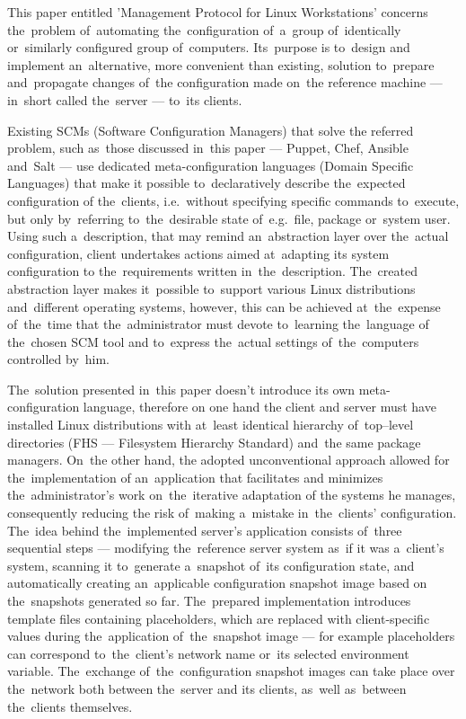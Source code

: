 \documentclass[11pt,a4paper]{article}
\begin{document}
This paper entitled 'Management Protocol for Linux Workstations' concerns the~problem of~automating the~configuration of~a~group of~identically or~similarly configured group of~computers. Its~purpose is to~design and implement an~alternative, more convenient than existing, solution to~prepare and~propagate changes of~the configuration made on~the reference machine --- in~short called the~server --- to~its clients.

Existing SCMs (Software Configuration Managers) that solve the referred problem, such as~those discussed in~this paper --- Puppet, Chef, Ansible and~Salt --- use dedicated meta-configuration languages (Domain Specific Languages) that make it possible to~declaratively describe the~expected configuration of the~clients, i.e.~without specifying specific commands to~execute, but only by~referring to~the~desirable state of~e.g.~file, package or~system user. Using such a~description, that may remind an~abstraction layer over the~actual configuration, client undertakes actions aimed at~adapting its system configuration to the~requirements written in~the~description. The~created abstraction layer makes it~possible to~support various Linux distributions and~different operating systems, however, this can be achieved at~the~expense of~the~time that the~administrator must devote to~learning the~language of the~chosen SCM tool and to~express the~actual settings of~the~computers controlled by~him.

The~solution presented in~this paper doesn't introduce its own meta-configuration language, therefore on one hand the client and server must have installed Linux distributions with at~least identical hierarchy of~top--level directories (FHS --- Filesystem Hierarchy Standard) and~the same package managers. On~the other hand, the adopted unconventional approach allowed for the~implementation of an~application that facilitates and minimizes the~administrator's work on~the~iterative adaptation of the systems he manages, consequently reducing the risk of~making a~mistake in~the~clients' configuration. The~idea behind the~implemented server's application consists of~three sequential steps --- modifying the~reference server system as~if it was a~client's system, scanning it to~generate a~snapshot of~its configuration state, and automatically creating an~applicable configuration snapshot image based on the~snapshots generated so far. The~prepared implementation introduces template files containing placeholders, which are replaced with client-specific values during the~application of~the~snapshot image --- for example placeholders can correspond to~the~client's network name or~its selected environment variable. The~exchange of~the~configuration snapshot images can take place over the~network both between the~server and its clients, as~well as~between the~clients themselves.
\end{document}
